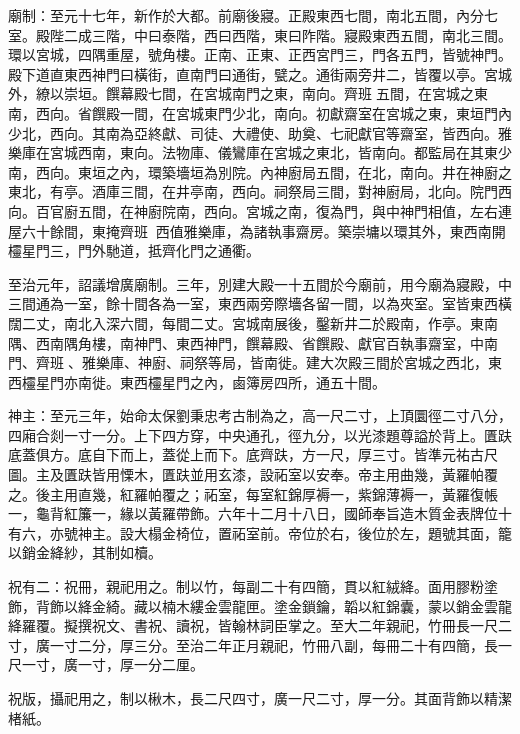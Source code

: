 \begin{pinyinscope}
 廟制：至元十七年，新作於大都。前廟後寢。正殿東西七間，南北五間，內分七室。殿陛二成三階，中曰泰階，西曰西階，東曰阼階。寢殿東西五間，南北三間。環以宮城，四隅重屋，號角樓。正南、正東、正西宮門三，門各五門，皆號神門。殿下道直東西神門曰橫街，直南門曰通街，甓之。通街兩旁井二，皆覆以亭。宮城外，繚以崇垣。饌幕殿七間，在宮城南門之東，南向。齊班五間，在宮城之東南，西向。省饌殿一間，在宮城東門少北，南向。初獻齋室在宮城之東，東垣門內少北，西向。其南為亞終獻、司徒、大禮使、助奠、七祀獻官等齋室，皆西向。雅樂庫在宮城西南，東向。法物庫、儀鸞庫在宮城之東北，皆南向。都監局在其東少南，西向。東垣之內，環築墻垣為別院。內神廚局五間，在北，南向。井在神廚之東北，有亭。酒庫三間，在井亭南，西向。祠祭局三間，對神廚局，北向。院門西向。百官廚五間，在神廚院南，西向。宮城之南，復為門，與中神門相值，左右連屋六十餘間，東掩齊班，西值雅樂庫，為諸執事齋房。築崇墉以環其外，東西南開欞星門三，門外馳道，抵齊化門之通衢。



 至治元年，詔議增廣廟制。三年，別建大殿一十五間於今廟前，用今廟為寢殿，中三間通為一室，餘十間各為一室，東西兩旁際墻各留一間，以為夾室。室皆東西橫闊二丈，南北入深六間，每間二丈。宮城南展後，鑿新井二於殿南，作亭。東南隅、西南隅角樓，南神門、東西神門，饌幕殿、省饌殿、獻官百執事齋室，中南門、齊班、雅樂庫、神廚、祠祭等局，皆南徙。建大次殿三間於宮城之西北，東西欞星門亦南徙。東西欞星門之內，鹵簿房四所，通五十間。



 神主：至元三年，始命太保劉秉忠考古制為之，高一尺二寸，上頂圜徑二寸八分，四廂合剡一寸一分。上下四方穿，中央通孔，徑九分，以光漆題尊謚於背上。匱趺底蓋俱方。底自下而上，蓋從上而下。底齊趺，方一尺，厚三寸。皆準元祐古尺圖。主及匱趺皆用慄木，匱趺並用玄漆，設祏室以安奉。帝主用曲幾，黃羅帕覆之。後主用直幾，紅羅帕覆之；祏室，每室紅錦厚褥一，紫錦薄褥一，黃羅復帳一，龜背紅簾一，緣以黃羅帶飾。六年十二月十八日，國師奉旨造木質金表牌位十有六，亦號神主。設大榻金椅位，置祏室前。帝位於右，後位於左，題號其面，籠以銷金絳紗，其制如櫝。



 祝有二：祝冊，親祀用之。制以竹，每副二十有四簡，貫以紅絨絳。面用膠粉塗飾，背飾以絳金綺。藏以楠木縷金雲龍匣。塗金鎖鑰，韜以紅錦囊，蒙以銷金雲龍絳羅覆。擬撰祝文、書祝、讀祝，皆翰林詞臣掌之。至大二年親祀，竹冊長一尺二寸，廣一寸二分，厚三分。至治二年正月親祀，竹冊八副，每冊二十有四簡，長一尺一寸，廣一寸，厚一分二厘。



 祝版，攝祀用之，制以楸木，長二尺四寸，廣一尺二寸，厚一分。其面背飾以精潔楮紙。




\end{pinyinscope}
